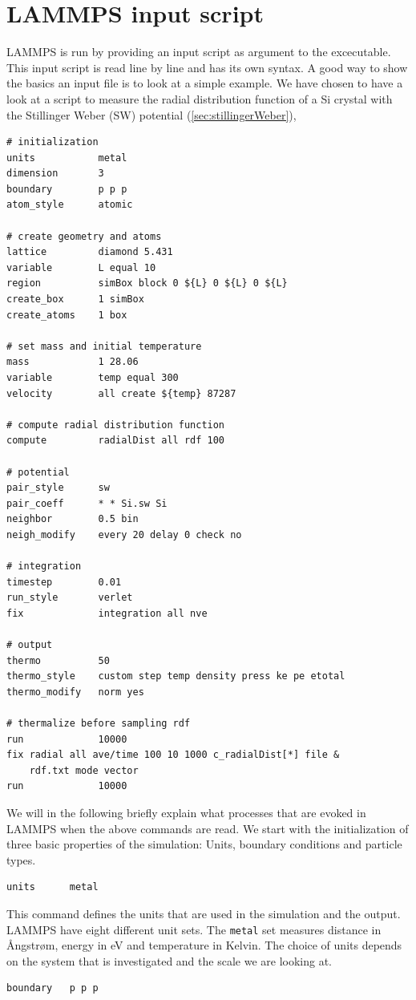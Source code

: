 \documentclass[twoside,english]{uiofysmaster}
\begin{document}
\section{LAMMPS input script}
LAMMPS is run by providing an input script as 
argument to the excecutable. This input script
is read line by line and has its own syntax. 
A good way to show the basics an input file
is to look at a simple example. 
We have chosen to have a look at a script
to measure the radial distribution function of a Si crystal with the Stillinger Weber (SW) potential (\autoref{sec:stillingerWeber}),
\begin{lstlisting}[style=lammps]
# initialization
units 			metal		
dimension 		3
boundary		p p p		
atom_style		atomic		

# create geometry and atoms
lattice 		diamond 5.431
variable		L equal 10
region 			simBox block 0 ${L} 0 ${L} 0 ${L}
create_box		1 simBox
create_atoms	1 box

# set mass and initial temperature
mass			1 28.06
variable		temp equal 300
velocity		all create ${temp} 87287

# compute radial distribution function
compute 		radialDist all rdf 100

# potential 
pair_style		sw
pair_coeff		* * Si.sw Si
neighbor		0.5 bin
neigh_modify	every 20 delay 0 check no

# integration
timestep 		0.01
run_style 		verlet
fix 			integration all nve

# output
thermo			50
thermo_style 	custom step temp density press ke pe etotal 
thermo_modify 	norm yes

# thermalize before sampling rdf
run				10000
fix radial all ave/time 100 10 1000 c_radialDist[*] file &
    rdf.txt mode vector
run				10000
\end{lstlisting}
We will in the following briefly explain what
processes that are evoked in LAMMPS when the 
above commands are read. We start with the initialization of 
three basic properties of the simulation: Units, boundary conditions and particle types.
\begin{lstlisting}[style=lammps]
 units 		metal
\end{lstlisting}
This command defines the units that are used 
in the simulation and the output. LAMMPS have eight
different unit sets. The \texttt{metal} set measures
distance in \AA{}ngstr\o{}m, energy in eV and temperature
in Kelvin. The choice of units depends on the system
that is investigated and the scale we are looking at.
\begin{lstlisting}[style=lammps]
 boundary 	p p p
\end{lstlisting}
\end{document}

